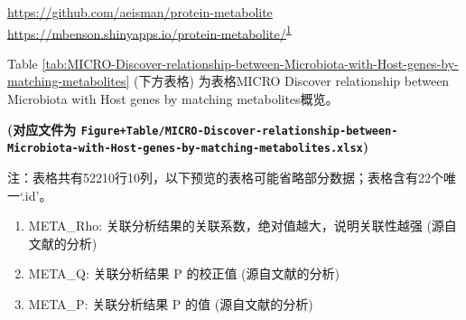 \documentclass[
]{article}
\providecommand{\tightlist}{%
  \setlength{\itemsep}{0pt}\setlength{\parskip}{0pt}}
\begin{document}
\url{https://github.com/aeisman/protein-metabolite}
\url{https://mbenson.shinyapps.io/protein-metabolite/}\textsuperscript{\protect\hyperlink{ref-ProteinMetabolBenson2023}{1}}

Table \ref{tab:MICRO-Discover-relationship-between-Microbiota-with-Host-genes-by-matching-metabolites} (下方表格) 为表格MICRO Discover relationship between Microbiota with Host genes by matching metabolites概览。

\textbf{(对应文件为 \texttt{Figure+Table/MICRO-Discover-relationship-between-Microbiota-with-Host-genes-by-matching-metabolites.xlsx})}

\begin{center}\begin{tcolorbox}[colback=gray!10, colframe=gray!50, width=0.9\linewidth, arc=1mm, boxrule=0.5pt]注：表格共有52210行10列，以下预览的表格可能省略部分数据；表格含有22个唯一`.id'。
\end{tcolorbox}
\end{center}
\begin{center}\begin{tcolorbox}[colback=gray!10, colframe=gray!50, width=0.9\linewidth, arc=1mm, boxrule=0.5pt]\begin{enumerate}\tightlist
\item META\_Rho:  关联分析结果的关联系数，绝对值越大，说明关联性越强 (源自文献的分析)
\item META\_Q:  关联分析结果 P 的校正值 (源自文献的分析)
\item META\_P:  关联分析结果 P 的值 (源自文献的分析)
\end{enumerate}\end{tcolorbox}
\end{center}
\end{document}
